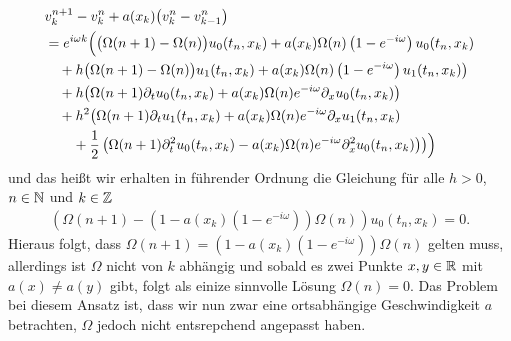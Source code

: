 \begin{align}\label{eq:wkb:difflsg}
\begin{split}
&v^{n+1}_k - v^n_k + a(x_k) \bigl( v^n_k - v^n_{k-1} \bigr)\\
&= e^{i \omega k} \Bigl(
\bigl(\Omega(n+1) - \Omega(n) \bigr) u_0(t_n, x_k) + a(x_k) \Omega(n) \left(1-e^{-i \omega}\right) u_0(t_n, x_k)\\
&\quad + h \bigl(\Omega(n+1) - \Omega(n) \bigr) u_1(t_n, x_k) + a(x_k) \Omega(n) \left(1-e^{-i \omega}\right) u_1(t_n, x_k) \bigr)\\
&\quad + h \bigl( \Omega(n+1) \partial_t u_0(t_n, x_k) + a(x_k) \Omega(n) e^{-i \omega} \partial_x u_0(t_n, x_k) \bigr)\\
&\quad + h^2 \bigl( \Omega(n+1) \partial_t u_1(t_n, x_k) + a(x_k) \Omega(n) e^{-i \omega} \partial_x u_1(t_n, x_k)\\
&\qquad + \frac{1}{2} \left( \Omega(n+1) \partial^2_t u_0(t_n, x_k) - a(x_k) \Omega(n) e^{-i \omega} \partial^2_x u_0(t_n, x_k) \right) \bigr) 
\Bigr)
\end{split}
\end{align}
und das heißt wir erhalten in führender Ordnung die Gleichung für alle $h > 0$, $n \in \mathbb N$ und $k \in \mathbb Z$
\begin{align}
\left( \Omega(n+1) - \left( 1 - a(x_k) \left(1-e^{-i \omega}\right) \right) \Omega(n) \right) u_0(t_n, x_k) = 0.
\end{align}
Hieraus folgt, dass 
$\Omega(n+1) = \left( 1 - a(x_k) \left(1-e^{-i \omega}\right) \right) \Omega(n)$
gelten muss, allerdings ist $\Omega$ nicht von $k$ abhängig und sobald es zwei Punkte $x,y \in \mathbb R$ mit $a(x) \neq a(y)$ gibt, folgt als einize sinnvolle Lösung $\Omega(n) = 0$.
Das Problem bei diesem Ansatz ist, dass wir nun zwar eine ortsabhängige Geschwindigkeit $a$ betrachten, $\Omega$ jedoch nicht entsrepchend angepasst haben.

